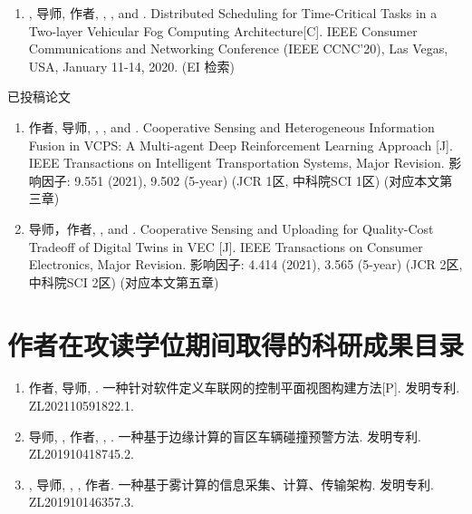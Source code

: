 \begin{enumerate}
	\item {}, 导师, 作者\textbf{}, , ,  and . Distributed Scheduling for Time-Critical Tasks in a Two-layer Vehicular Fog Computing Architecture[C]. IEEE Consumer Communications and Networking Conference (IEEE CCNC’20), Las Vegas, USA, January 11-14, 2020. (EI 检索)
\end{enumerate}

已投稿论文

\begin{enumerate}
	\item 作者\textbf{}, 导师, , , and . Cooperative Sensing and Heterogeneous Information Fusion in VCPS: A Multi-agent Deep Reinforcement Learning Approach [J]. IEEE Transactions on Intelligent Transportation Systems, Major Revision. 影响因子: 9.551 (2021), 9.502 (5-year) (JCR 1区, 中科院SCI 1区) (对应本文第三章)
	\item 导师，作者\textbf{}, , and . Cooperative Sensing and Uploading for Quality-Cost Tradeoff of Digital Twins in VEC [J]. IEEE Transactions on Consumer Electronics, Major Revision. 影响因子: 4.414 (2021), 3.565 (5-year) (JCR 2区, 中科院SCI 2区) (对应本文第五章) 
\end{enumerate}

\section{作者在攻读学位期间取得的科研成果目录}
\begin{enumerate}
	\item 作者\textbf{}, 导师, . 一种针对软件定义车联网的控制平面视图构建方法[P]. 发明专利. ZL202110591822.1.
	\item 导师, , 作者\textbf{}, , . 一种基于边缘计算的盲区车辆碰撞预警方法. 发明专利. ZL201910418745.2.
	\item {}, 导师, , , 作者\textbf{}. 一种基于雾计算的信息采集、计算、传输架构. 发明专利. ZL201910146357.3.
\end{enumerate}

